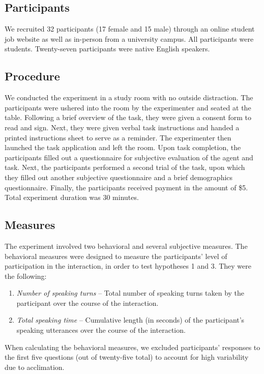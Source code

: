 \subsection{Participants}

We recruited 32 participants (17 female and 15 male) through an online student job website as well as in-person from a university campus. All participants were students. Twenty-seven participants were native English speakers.

\subsection{Procedure}

We conducted the experiment in a study room with no outside distraction. The participants were ushered into the room by the experimenter and seated at the table. Following a brief overview of the task, they were given a consent form to read and sign. Next, they were given verbal task instructions and handed a printed instructions sheet to serve as a reminder. The experimenter then launched the task application and left the room. Upon task completion, the participants filled out a questionnaire for subjective evaluation of the agent and task. Next, the participants performed a second trial of the task, upon which they filled out another subjective questionnaire and a brief demographics questionnaire. Finally, the participants received payment in the amount of \$5. Total experiment duration was 30 minutes.

\subsection{Measures}

The experiment involved two behavioral and several subjective measures. The behavioral measures were designed to measure the participants' level of participation in the interaction, in order to test hypotheses 1 and 3. They were the following:

\begin{enumerate}
\item \emph{Number of speaking turns} -- Total number of speaking turns taken by the participant over the course of the interaction.
\item \emph{Total speaking time} -- Cumulative length (in seconds) of the participant's speaking utterances over the course of the interaction.
\end{enumerate}

When calculating the behavioral measures, we excluded participants' responses to the first five questions (out of twenty-five total) to account for high variability due to acclimation.

